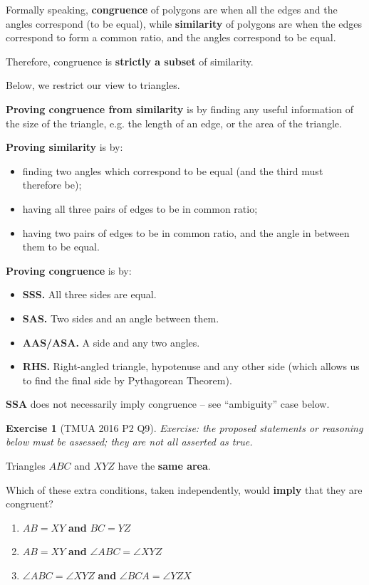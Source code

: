 \documentclass[11pt]{article}
\theoremstyle{definition}
\newtheorem{example}[theorem]{Exercise}
\theoremstyle{remark}
\begin{document}
Formally speaking, \textbf{congruence} of polygons are when all the edges and the angles correspond (to be equal), while \textbf{similarity} of polygons are when the edges correspond to form a common ratio, and the angles correspond to be equal.

Therefore, congruence is \textbf{strictly a subset} of similarity.

Below, we restrict our view to triangles.

\textbf{Proving congruence from similarity} is by finding any useful information of the size of the triangle, e.g. the length of an edge, or the area of the triangle.

\textbf{Proving similarity} is by:
\begin{itemize}
    \item finding two angles which correspond to be equal (and the third must therefore be);
    \item having all three pairs of edges to be in common ratio;
    \item having two pairs of edges to be in common ratio, and the angle in between them to be equal.
\end{itemize}

\textbf{Proving congruence} is by:
\begin{itemize}
    \item \textbf{SSS.} All three sides are equal.
    \item \textbf{SAS.} Two sides and an angle between them.
    \item \textbf{AAS/ASA.} A side and any two angles.
    \item \textbf{RHS.} Right-angled triangle, hypotenuse and any other side (which allows us to find the final side by Pythagorean Theorem).
\end{itemize}

\textbf{SSA} does not necessarily imply congruence -- see ``ambiguity'' case below.

\begin{example}[TMUA 2016 P2 Q9]\label{tmua-3-unit-007}
\textit{Exercise: the proposed statements or reasoning below must be assessed; they are not all asserted as true.}\par

    Triangles \(ABC\) and \(XYZ\) have the \textbf{same area}.

    Which of these extra conditions, taken independently, would \textbf{imply} that they are congruent?

    \begin{enumerate}[label=\Roman*]
        \item \(AB = XY\) \textbf{and} \(BC = YZ\)
        \item \(AB = XY\) \textbf{and} \(\angle ABC = \angle XYZ\)
        \item \(\angle ABC = \angle XYZ\) \textbf{and} \(\angle BCA = \angle YZX\)
    \end{enumerate}
\end{example}
\end{document}
